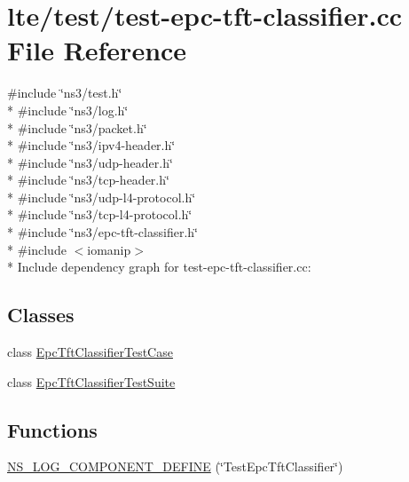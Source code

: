 \hypertarget{test-epc-tft-classifier_8cc}{}\section{lte/test/test-\/epc-\/tft-\/classifier.cc File Reference}
\label{test-epc-tft-classifier_8cc}
{\ttfamily \#include \char`\"{}ns3/test.\+h\char`\"{}}\\*
{\ttfamily \#include \char`\"{}ns3/log.\+h\char`\"{}}\\*
{\ttfamily \#include \char`\"{}ns3/packet.\+h\char`\"{}}\\*
{\ttfamily \#include \char`\"{}ns3/ipv4-\/header.\+h\char`\"{}}\\*
{\ttfamily \#include \char`\"{}ns3/udp-\/header.\+h\char`\"{}}\\*
{\ttfamily \#include \char`\"{}ns3/tcp-\/header.\+h\char`\"{}}\\*
{\ttfamily \#include \char`\"{}ns3/udp-\/l4-\/protocol.\+h\char`\"{}}\\*
{\ttfamily \#include \char`\"{}ns3/tcp-\/l4-\/protocol.\+h\char`\"{}}\\*
{\ttfamily \#include \char`\"{}ns3/epc-\/tft-\/classifier.\+h\char`\"{}}\\*
{\ttfamily \#include $<$iomanip$>$}\\*
Include dependency graph for test-\/epc-\/tft-\/classifier.cc\+:
\subsection*{Classes}
\begin{DoxyCompactItemize}
\item 
class \hyperlink{classEpcTftClassifierTestCase}{Epc\+Tft\+Classifier\+Test\+Case}
\item 
class \hyperlink{classEpcTftClassifierTestSuite}{Epc\+Tft\+Classifier\+Test\+Suite}
\end{DoxyCompactItemize}
\subsection*{Functions}
\begin{DoxyCompactItemize}
\item 
\hyperlink{test-epc-tft-classifier_8cc_adddf3f06905813b034314d0fb2401212}{N\+S\+\_\+\+L\+O\+G\+\_\+\+C\+O\+M\+P\+O\+N\+E\+N\+T\+\_\+\+D\+E\+F\+I\+NE} (\char`\"{}Test\+Epc\+Tft\+Classifier\char`\"{})
\end{DoxyCompactItemize}
